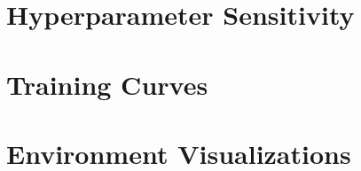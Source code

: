 \documentclass[11pt,a4paper]{article}
\begin{document}
\appendix

\section{Hyperparameter Sensitivity}
\label{sec:appendix_hp}


\section{Training Curves}
\label{sec:appendix_curves}


\section{Environment Visualizations}
\label{sec:appendix_vis}

\end{document}
